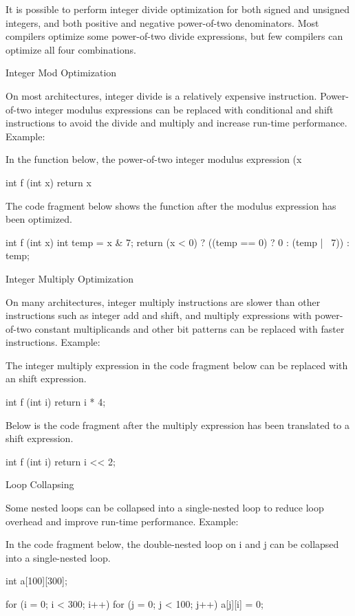 {{{{{{{{{{It is possible to perform integer divide optimization for both signed and unsigned integers, and both positive and negative power-of-two denominators. Most compilers optimize some power-of-two divide expressions, but few compilers can optimize all four combinations.

Integer Mod Optimization

On most architectures, integer divide is a relatively expensive instruction. Power-of-two integer modulus expressions can be replaced with conditional and shift instructions to avoid the divide and multiply and increase run-time performance.
Example:

In the function below, the power-of-two integer modulus expression (x %

    int f (int x)
    {
      return x %
    }

The code fragment below shows the function after the modulus expression has been optimized.

    int f (int x)
    {
      int temp = x & 7;
      return (x < 0) ? ((temp == 0) ? 0 : (temp | ~7)) : temp;
    }

Integer Multiply Optimization

On many architectures, integer multiply instructions are slower than other instructions such as integer add and shift, and multiply expressions with power-of-two constant multiplicands and other bit patterns can be replaced with faster instructions.
Example:

The integer multiply expression in the code fragment below can be replaced with an shift expression.

    int f (int i)
    {
      return i * 4;
    }

Below is the code fragment after the multiply expression has been translated to a shift expression.

    int f (int i)
    {
      return i << 2;
    }

Loop Collapsing

Some nested loops can be collapsed into a single-nested loop to reduce loop overhead and improve run-time performance.
Example:

In the code fragment below, the double-nested loop on i and j can be collapsed into a single-nested loop.

    int a[100][300];

    for (i = 0; i < 300; i++)
      for (j = 0; j < 100; j++)
        a[j][i] = 0;

}}}}}}}}}}
